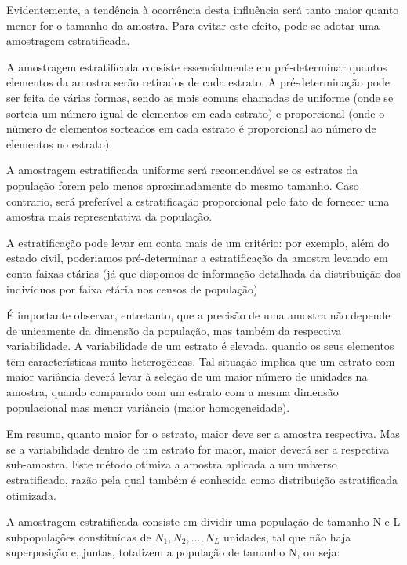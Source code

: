 Evidentemente, a tendência à ocorrência desta influência será
tanto maior quanto menor for o tamanho da amostra. Para evitar
este efeito, pode-se adotar uma amostragem estratificada.\vskip0.3cm

A amostragem estratificada consiste essencialmente em
pré-determinar quantos elementos da amostra serão retirados de
cada estrato. A pré-determinação pode ser feita de várias formas,
sendo as mais comuns chamadas de uniforme (onde se sorteia um
número igual de elementos em cada estrato) e proporcional (onde o
número de elementos sorteados em cada estrato é proporcional ao
número de elementos no estrato).\vskip0.3cm



A amostragem estratificada uniforme será recomendável se os
estratos da população forem pelo menos aproximadamente do mesmo
tamanho. Caso contrario, será preferível a estratificação
proporcional pelo fato de fornecer uma amostra mais representativa
da população.\vskip0.3cm


A estratificação pode levar em conta mais de um critério: por
exemplo, além do estado civil, poderiamos pré-determinar a
estratificação da amostra levando em conta faixas etárias (já que
dispomos de informação detalhada da distribuição dos indivíduos
por faixa etária nos censos de população)\vskip0.3cm

É importante observar, entretanto, que a precisão de uma amostra
não depende de unicamente da dimensão da população, mas também da
respectiva variabilidade. A variabilidade de um estrato é elevada,
quando os seus elementos têm características muito heterogêneas.
Tal situação implica que um estrato com maior variância deverá
levar à seleção de um maior número de unidades na amostra, quando
comparado com um estrato com a mesma dimensão populacional mas
menor variância (maior homogeneidade).\vskip0.3cm

Em resumo, quanto maior for o estrato, maior deve ser a amostra
respectiva. Mas se a variabilidade dentro de um estrato for maior,
maior deverá ser a respectiva sub-amostra. Este método otimiza a
amostra aplicada a um universo estratificado, razão pela qual
também é conhecida como distribuição estratificada
otimizada.\vskip0.3cm



\newpage
A amostragem estratificada consiste em dividir uma população de
tamanho N e L subpopulações constituídas de
$N_{1},N_{2},\ldots,N_{L}$ unidades, tal que não haja superposição
e, juntas, totalizem a população de tamanho N, ou seja:

